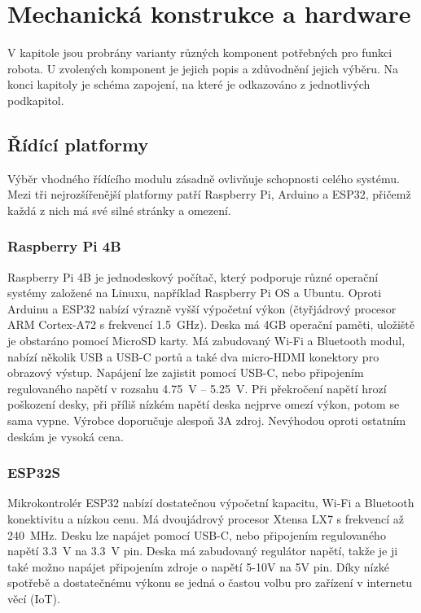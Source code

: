 \chapter{Mechanická konstrukce a hardware} 
\label{chap4}
V kapitole jsou probrány varianty různých komponent potřebných pro funkci robota. U zvolených komponent je jejich popis a zdůvodnění jejich výběru. Na konci kapitoly je schéma zapojení, na které je odkazováno z jednotlivých podkapitol.

\section{Řídící platformy}
Výběr vhodného řídícího modulu zásadně ovlivňuje schopnosti celého systému. Mezi tři nejrozšířenější platformy patří Raspberry Pi, Arduino a ESP32, přičemž každá z nich má své silné stránky a omezení.

\subsection*{Raspberry Pi 4B}
\label{rsb}
Raspberry Pi 4B je jednodeskový počítač, který podporuje různé operační systémy založené na Linuxu, například Raspberry Pi OS a Ubuntu. Oproti Arduinu a ESP32 nabízí výrazně vyšší výpočetní výkon (čtyřjádrový procesor ARM Cortex-A72 s frekvencí 1.5~GHz). Deska má 4GB operační paměti, uložiště je obstaráno pomocí MicroSD karty. Má zabudovaný Wi-Fi a Bluetooth modul, nabízí několik USB a USB-C portů a také dva micro-HDMI konektory pro obrazový výstup. Napájení lze zajistit pomocí USB-C, nebo připojením regulovaného napětí v rozsahu 4.75~V -- 5.25~V. Při překročení napětí hrozí poškození desky, při příliš nízkém napětí deska nejprve omezí výkon, potom se sama vypne. Výrobce doporučuje alespoň 3A zdroj. Nevýhodou oproti ostatním deskám je vysoká cena. \cite{raspberry}

\subsection*{ESP32S}
Mikrokontrolér ESP32 nabízí dostatečnou výpočetní kapacitu, Wi-Fi a Bluetooth konektivitu a nízkou cenu. Má dvoujádrový procesor Xtensa LX7 s frekvencí až 240~MHz. Desku lze napájet pomocí USB-C, nebo připojením regulovaného napětí 3.3~V na 3.3~V pin. Deska má zabudovaný regulátor napětí, takže je ji také možno napájet připojením zdroje o napětí 5-10V na 5V pin. Díky nízké spotřebě a dostatečnému výkonu se jedná o častou volbu pro zařízení v internetu věcí (IoT). \cite{ESP32}

